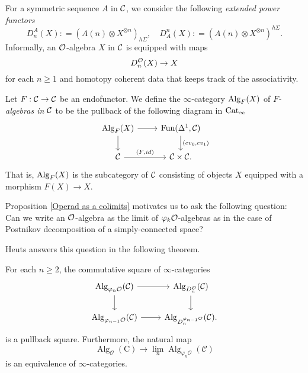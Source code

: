 For a symmetric sequence $A$ in ${\mathcal{C}}$, we consider the following \emph{extended power functors}
\begin{equation}
\label{extended power}
    D^{A}_n(X): = (A(n)\otimes X^{\otimes n })_{h\Sigma}, 
\quad
D_{A}^n(X): = (A(n)\otimes X^{\otimes n })^{h\Sigma}.
\end{equation}
Informally, an ${\mathcal{O}}$-algebra $X$ in ${\mathcal{C}}$ is equipped with maps
$$
D^{{\mathcal{O}}}_n(X) \to X
$$
for each $n\geq 1$ and homotopy coherent data that keeps track of the associativity.

\begin{definition}
Let $F:{\mathcal{C}}\to {\mathcal{C}}$ be an endofunctor.
	We define the $\infty$-category $\operatorname{Alg}_{F}(X)$ of \emph{$F$-algebras in ${\mathcal{C}}$} to be the pullback of the following diagram in $\operatorname{Cat}_{\infty}$
\[
\begin{tikzcd}
	\Alg_{F}(X) & 
	\Fun(\Delta^1, \CC)\\
	\CC & 
	\CC \times \CC
	\arrow[from=1-1, to= 1-2]
	\arrow[from=1-1, to=2-1]
	\arrow[from=1-2, to=2-2, "(ev_0\text{,} ev_1)"]
	\arrow[from=2-1, to= 2-2, "(F\text{,} id)"].
\end{tikzcd}
\]
That is, $\operatorname{Alg}_{F}(X)$ is the subcategory of ${\mathcal{C}}$ consisting of objects $X$ equipped with a morphism $F(X)\to X$.
\end{definition}

Proposition \ref{Operad as a colimits} motivates us to ask the following question: Can we write an ${\mathcal{O}}$-algebra as the limit of $\varphi_k{\mathcal{O}}$-algebras as in the case of Postnikov decomposition of a simply-connected space? 

Heuts answers this question in the following theorem.
\begin{theorem}
\cite[Theorem 4.1]{Heuts_Koszul}
\label{Thm 4.1 of Heuts Koszul Duality paper}
For each $n \geq 2$, the commutative square of $\infty$-categories
\[
\begin{tikzcd}
	\Alg_{\varphi_n\CO}(\CC) & 
	\Alg_{D^{\CO}_{n}}(\CC)\\
	\Alg_{\varphi_{n-1}\CO} (\CC)  & 
	\Alg_{D_{n}^{\varphi_{n-1}\CO}}(\CC)
	\arrow[from=1-1, to= 1-2]
	\arrow[from=1-1, to=2-1]
	\arrow[from=1-2, to=2-2]
	\arrow[from=2-1, to= 2-2].
\end{tikzcd}
\]
is a pullback square. Furthermore, the natural map
$$
\operatorname{Alg}_{\mathcal{O}}(\mathrm{C}) \rightarrow \lim _{n} \operatorname{Alg}_{\varphi_{n} \mathcal{O}}(\mathcal{C})
$$
is an equivalence of $\infty$-categories.
\end{theorem}

